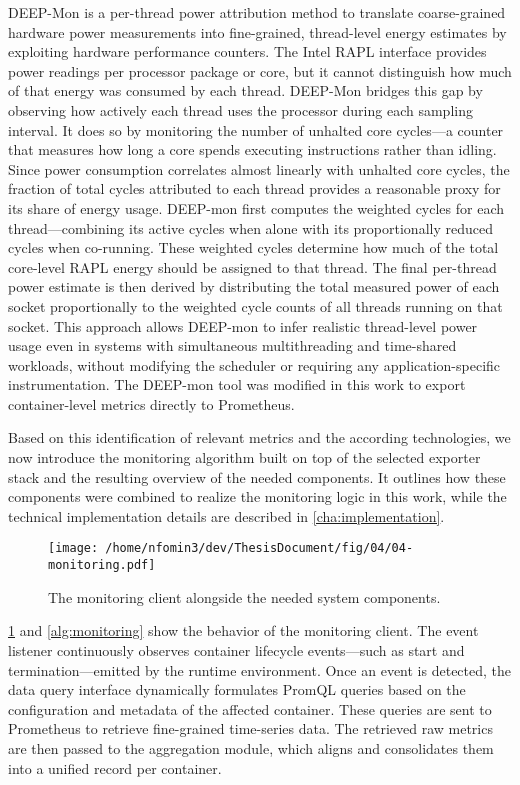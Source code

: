 DEEP-Mon is a per-thread power attribution method to translate coarse-grained hardware power measurements into fine-grained, thread-level energy estimates by exploiting hardware performance counters. The Intel RAPL interface provides power readings per processor package or core, but it cannot distinguish how much of that energy was consumed by each thread. DEEP-Mon bridges this gap by observing how actively each thread uses the processor during each sampling interval. It does so by monitoring the number of unhalted core cycles—a counter that measures how long a core spends executing instructions rather than idling. Since power consumption correlates almost linearly with unhalted core cycles, the fraction of total cycles attributed to each thread provides a reasonable proxy for its share of energy usage. DEEP-mon first computes the weighted cycles for each thread—combining its active cycles when alone with its proportionally reduced cycles when co-running. These weighted cycles determine how much of the total core-level RAPL energy should be assigned to that thread. The final per-thread power estimate is then derived by distributing the total measured power of each socket proportionally to the weighted cycle counts of all threads running on that socket. This approach allows DEEP-mon to infer realistic thread-level power usage even in systems with simultaneous multithreading and time-shared workloads, without modifying the scheduler or requiring any application-specific instrumentation. The DEEP-mon tool was modified in this work to export container-level metrics directly to Prometheus.

Based on this identification of relevant metrics and the according technologies, we now introduce the monitoring algorithm built on top of the selected exporter stack and the resulting overview of the needed components. It outlines how these components were combined to realize the monitoring logic in this work, while the technical implementation details are described in \ref{cha:implementation}.

\begin{figure}[htbp]
    \centering
    \texttt{[image: /home/nfomin3/dev/ThesisDocument/fig/04/04-monitoring.pdf]} %
    \caption{The monitoring client alongside the needed system components.}
    \label{fig:monitoring_client}
\end{figure}

\ref{fig:monitoring_client} and \ref{alg:monitoring} show the behavior of the monitoring client. The event listener continuously observes container lifecycle events—such as start and termination—emitted by the runtime environment. Once an event is detected, the data query interface dynamically formulates PromQL queries based on the configuration and metadata of the affected container. These queries are sent to Prometheus to retrieve fine-grained time-series data. The retrieved raw metrics are then passed to the aggregation module, which aligns and consolidates them into a unified record per container.

